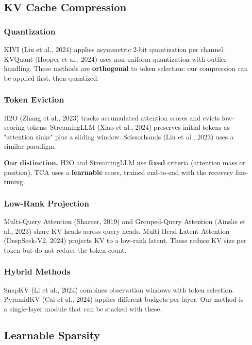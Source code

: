 \subsection{KV Cache Compression}

\subsubsection{Quantization}

KIVI (Liu et al., 2024) applies asymmetric 2-bit quantization per channel. 
KVQuant (Hooper et al., 2024) uses non-uniform quantization with outlier 
handling. These methods are \textbf{orthogonal} to token selection: our 
compression can be applied first, then quantized.

\subsubsection{Token Eviction}

H2O (Zhang et al., 2023) tracks accumulated attention scores and evicts 
low-scoring tokens. StreamingLLM (Xiao et al., 2024) preserves initial 
tokens as "attention sinks" plus a sliding window. Scissorhands (Liu et al., 
2023) uses a similar paradigm.

\textbf{Our distinction.} H2O and StreamingLLM use \textbf{fixed} criteria (attention 
mass or position). TCA uses a \textbf{learnable} score, trained end-to-end with 
the recovery fine-tuning.

\subsubsection{Low-Rank Projection}

Multi-Query Attention (Shazeer, 2019) and Grouped-Query Attention (Ainslie 
et al., 2023) share KV heads across query heads. Multi-Head Latent Attention 
(DeepSeek-V2, 2024) projects KV to a low-rank latent. These reduce KV size 
per token but do not reduce the token count.

\subsubsection{Hybrid Methods}

SnapKV (Li et al., 2024) combines observation windows with token selection. 
PyramidKV (Cai et al., 2024) applies different budgets per layer. Our method 
is a single-layer module that can be stacked with these.

\subsection{Learnable Sparsity}

